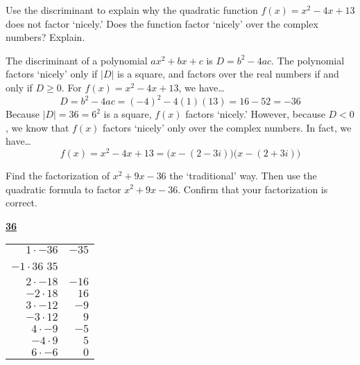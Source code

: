 \documentclass[11pt,letterpaper]{article}
\begin{document}

 Use the discriminant to explain why the quadratic function $f(x)= x^2 - 4x + 13$ does not factor `nicely.' Does the function factor `nicely' over the complex numbers? Explain. \pspace

\sol The discriminant of a polynomial $ax^2 + bx + c$ is $D= b^2 - 4ac$. The polynomial factors `nicely' only if $|D|$ is a square, and factors over the real numbers if and only if $D \geq 0$. For $f(x)= x^2 - 4x + 13$, we have\dots \pspace
	\[
	D= b^2 - 4ac = (-4)^2 - 4(1)(13)= 16 - 52= -36
	\] \pspace
Because $|D|= 36= 6^2$ is a square, $f(x)$ factors `nicely.' However, because $D < 0$, we know that $f(x)$ factors `nicely' only over the complex numbers. In fact, we have\dots \pspace
	\[
	f(x)= x^2 - 4x + 13= \big(x - (2 - 3i) \big) \big(x - (2 + 3i) \big)
	\]



\newpage



 Find the factorization of $x^2 + 9x - 36$ the `traditional' way. Then use the quadratic formula to factor $x^2 + 9x - 36$. Confirm that your factorization is correct. \pspace

\sol 
	\begin{table}[!ht]
	\centering
	\underline{\bfseries 36} \pvspace{0.2cm}
	\begin{tabular}{rr}
	$1 \cdot -36$ & $-35$ \\
	$-1 \cdot 36$ $35$ \\
	$2 \cdot -18$ & $-16$ \\
	$-2 \cdot 18$ & $16$ \\
	$3 \cdot -12$ & $-9$ \\ \hline
	\multicolumn{1}{|r}{$-3 \cdot 12$} & \multicolumn{1}{r|}{$9$} \\ \hline
	$4 \cdot -9$ & $-5$ \\
	$-4 \cdot 9$ & $5$ \\
	$6 \cdot -6$ & $0$
	\end{tabular}
	\end{table}
\end{document}
